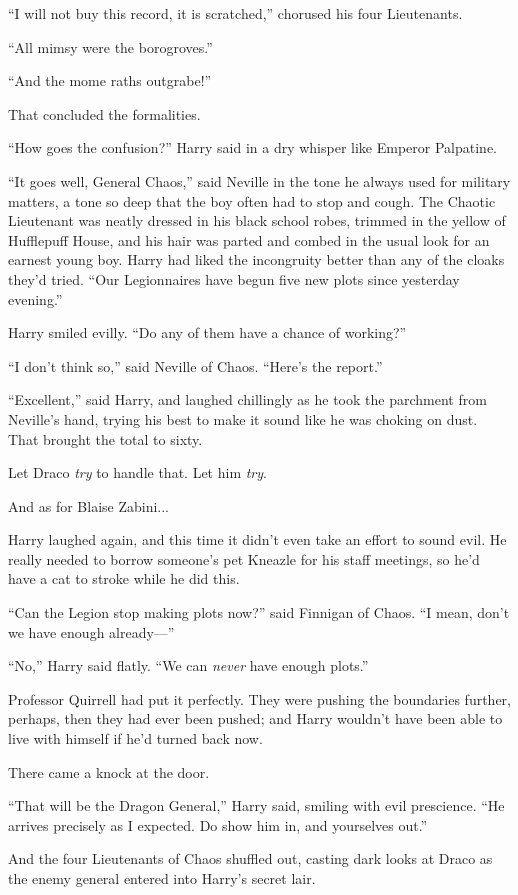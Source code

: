 “I will not buy this record, it is scratched,” chorused his four Lieutenants.

“All mimsy were the borogroves.”

“And the mome raths outgrabe!”

That concluded the formalities.

“How goes the confusion?” Harry said in a dry whisper like Emperor Palpatine.

“It goes well, General Chaos,” said Neville in the tone he always used for military matters, a tone so deep that the boy often had to stop and cough. The Chaotic Lieutenant was neatly dressed in his black school robes, trimmed in the yellow of Hufflepuff House, and his hair was parted and combed in the usual look for an earnest young boy. Harry had liked the incongruity better than any of the cloaks they’d tried. “Our Legionnaires have begun five new plots since yesterday evening.”

Harry smiled evilly. “Do any of them have a chance of working?”

“I don’t think so,” said Neville of Chaos. “Here’s the report.”

“Excellent,” said Harry, and laughed chillingly as he took the parchment from Neville’s hand, trying his best to make it sound like he was choking on dust. That brought the total to sixty.

Let Draco \emph{try} to handle that. Let him \emph{try}.

And as for Blaise Zabini...

Harry laughed again, and this time it didn’t even take an effort to sound evil. He really needed to borrow someone’s pet Kneazle for his staff meetings, so he’d have a cat to stroke while he did this.

“Can the Legion stop making plots now?” said Finnigan of Chaos. “I mean, don’t we have enough already—”

“No,” Harry said flatly. “We can \emph{never} have enough plots.”

Professor Quirrell had put it perfectly. They were pushing the boundaries further, perhaps, then they had ever been pushed; and Harry wouldn’t have been able to live with himself if he’d turned back now.

There came a knock at the door.

“That will be the Dragon General,” Harry said, smiling with evil prescience. “He arrives precisely as I expected. Do show him in, and yourselves out.”

And the four Lieutenants of Chaos shuffled out, casting dark looks at Draco as the enemy general entered into Harry’s secret lair.


